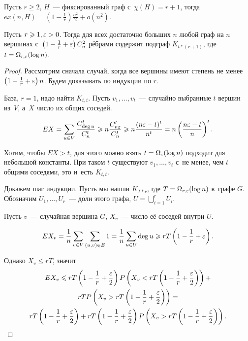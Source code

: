 \documentclass{article}
\begin{document}
\begin{theorem}
	Пусть $r \ge 2$, $H$~--- фиксированный граф с~$\chi(H) = r + 1$, тогда
	$ex(n, H) = \left(1 - \frac{1}{r}\right) \frac{n^2}{2} + o(n^2)$.
\end{theorem}
\begin{lemma}
	Пусть $r \geqslant 1, \varepsilon > 0$. Тогда для всех достаточно больших $n$ любой граф
	на $n$ вершинах с~$\left(1 - \frac{1}{r} + \varepsilon\right)C_n^2$ рёбрами
	содержит подграф $K_{t \ast (r + 1)}$, где $t = \Omega_{r,\varepsilon}(\log n)$.
\end{lemma}
\begin{proof}
	Рассмотрим сначала случай, когда все вершины имеют степень не менее $\left(1
	- \frac{1}{r} + \varepsilon\right)n$. Будем доказывать по индукции по $r$.

	База, $r = 1$, надо найти $K_{t,t}$. Пусть $v_1, \ldots, v_t$~--- случайно
	выбранные $t$ вершин из~$V$, а~$X$ число их общих соседей.

	$$EX = \sum\limits_{u \in V} \frac{C_{\deg u}^t}{C_n^t} \geqslant n
	\frac{C_{n\varepsilon}^t}{C_n^t} \geqslant n \frac{(n\varepsilon - t)^t}{n^t} = n \left(
	\frac{n\varepsilon - t}{n}\right)^t.$$

	Хотим, чтобы $EX > t$, для этого можно взять $t = \Omega_\varepsilon(\log n)$
	подходит для небольшой константы. При таком $t$ существуют $v_1, \ldots,
	v_t$ с~не менее, чем $t$ общими соседями, это и~есть $K_{t,t}$.

	Докажем шаг индукции. Пусть мы нашли $K_{T \ast r}$, где $T =
	\Omega_{r,\varepsilon}(\log n)$ в~графе $G$. Обозначим $U_1, \ldots, U_r$~--- доли
	этого графа, $U = \bigcup\limits_{i=1}^{r} U_i$.

	Пусть $v$~--- случайная вершина $G$, $X_v$~--- число её соседей внутри $U$.

	$$ E X_v = \frac{1}{n} \sum\limits_{v \in V} \sum\limits_{(u,v) \in E} 1 =
	\frac{1}{n} \sum\limits_{u \in U} \deg u \geqslant rT \left(1 - \frac{1}{r} +
	\varepsilon\right).$$

	Однако $X_v \le rT$, значит
	\begin{multline*}
	EX_v \leqslant rT\left(1 - \frac{1}{r} + \frac{\varepsilon}{2}\right)
	P\left(X_v < rT \left(1 - \frac{1}{r} + \frac{\varepsilon}{2}\right)\right) +\\
	rTP\left(X_v > rT \left(1 - \frac{1}{r} + \frac{\varepsilon}{2}\right)\right) =\\
	rT\left(1 - \frac{1}{r} + \frac{\varepsilon}{2}\right) +
	rT\left(1 - \frac{1}{r} + \frac{\varepsilon}{2}\right)
	P\left( X_v > rT \left(1 - \frac{1}{r} + \frac{\varepsilon}{2}\right) \right).
	\end{multline*}


\end{proof}
\end{document}
